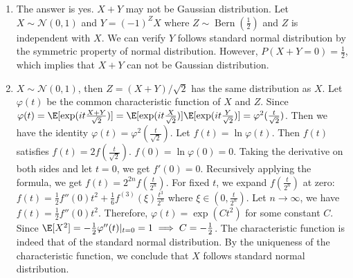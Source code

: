 \documentclass{article}
\DeclareMathOperator{\Bern}{Bern}
\begin{document}
\courseheader
{}

\begin{enumerate}
\item The answer is yes. $X+Y$ may not be Gaussian
distribution. 
Let $X\sim \mathcal{N}(0,1)$ and $Y=(-1)^Z X$ where $Z \sim \Bern(\frac{1}{2})$ and $Z$ is independent with $X$. We can verify $Y$ follows standard normal
distribution by the symmetric property of
normal distribution. However, $P(X+Y=0)=\frac{1}{2}$, which implies that
$X+Y$ can not be Gaussian distribution.

\item $X \sim \mathcal{N}(0,1)$, then $Z=(X+Y)/\sqrt{2}$ has the same distribution as
$X$. Let $\varphi(t)$ be the common characteristic
function of $X$ and $Z$. Since $\varphi(t)=
\E[\exp(it\frac{X+Y}{\sqrt{2}})]
=\E[\exp(it\frac{X}{\sqrt{2}})]
\E[\exp(it\frac{Y}{\sqrt{2}})]=
\varphi^2(\frac{t}{\sqrt{2}})$.
Then we have the identity $\varphi(t)=\varphi^2(\frac{t}{\sqrt{2}})$.
Let $f(t) = \ln \varphi(t)$. Then $f(t)$
satisfies $f(t)=2f(\frac{t}{\sqrt{2}})$.
$f(0)=\ln \varphi(0)=0$.
Taking the derivative on both sides and let
$t=0$, we get $f'(0)=0$. Recursively applying
the formula, we get $f(t) = 2^{2n} f(\frac{t}{2^{n}})$. For fixed $t$,
we expand $f(\frac{t}{2^{n}})$ at zero:
$f(t) = \frac{1}{2}f''(0)t^2 + \frac{1}{6}f^{(3)}(\xi)\frac{t^3}{2^n}$
where $\xi \in (0, \frac{t}{2^{n}})$.
Let $n\to \infty$, we have $f(t)=\frac{1}{2}f''(0)t^2$.
Therefore, $\varphi(t)=\exp(Ct^2)$ for some constant $C$.
Since $\E[X^2]=-\frac{1}{2}\varphi''(t)|_{t=0}=1 \implies C=-\frac{1}{2}$. The characteristic function is indeed
that of the standard normal distribution. By the uniqueness
of the characteristic function, we conclude that $X$
follows standard normal distribution.


\end{enumerate}
\end{document}
